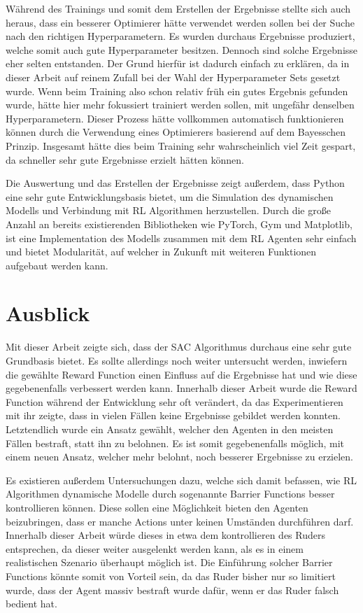 \documentclass[]{iat}
\begin{document}
Während des Trainings und somit dem Erstellen der Ergebnisse stellte sich auch heraus, dass ein besserer Optimierer hätte verwendet werden sollen bei der Suche nach den richtigen Hyperparametern. Es wurden durchaus Ergebnisse produziert, welche somit auch gute Hyperparameter besitzen. Dennoch sind solche Ergebnisse eher selten entstanden. Der Grund hierfür ist dadurch einfach zu erklären, da in dieser Arbeit auf reinem Zufall bei der Wahl der Hyperparameter Sets gesetzt wurde. Wenn beim Training also schon relativ früh ein gutes Ergebnis gefunden wurde, hätte hier mehr fokussiert trainiert werden sollen, mit ungefähr denselben Hyperparametern. Dieser Prozess hätte vollkommen automatisch funktionieren können durch die Verwendung eines Optimierers basierend auf dem Bayesschen Prinzip. Insgesamt hätte dies beim Training sehr wahrscheinlich viel Zeit gespart, da schneller sehr gute Ergebnisse erzielt hätten können.

Die Auswertung und das Erstellen der Ergebnisse zeigt außerdem, dass Python eine sehr gute Entwicklungsbasis bietet, um die Simulation des dynamischen Modells und Verbindung mit RL Algorithmen herzustellen. Durch die große Anzahl an bereits existierenden Bibliotheken wie PyTorch, Gym und Matplotlib, ist eine Implementation des Modells zusammen mit dem RL Agenten sehr einfach und bietet Modularität, auf welcher in Zukunft mit weiteren Funktionen aufgebaut werden kann.
\section{Ausblick}
Mit dieser Arbeit zeigte sich, dass der SAC Algorithmus durchaus eine sehr gute Grundbasis bietet. Es sollte allerdings noch weiter untersucht werden, inwiefern die gewählte Reward Function einen Einfluss auf die Ergebnisse hat und wie diese gegebenenfalls verbessert werden kann. Innerhalb dieser Arbeit wurde die Reward Function während der Entwicklung sehr oft verändert, da das Experimentieren mit ihr zeigte, dass in vielen Fällen keine Ergebnisse gebildet werden konnten. Letztendlich wurde ein Ansatz gewählt, welcher den Agenten in den meisten Fällen bestraft, statt ihn zu belohnen. Es ist somit gegebenenfalls möglich, mit einem neuen Ansatz, welcher mehr belohnt, noch besserer Ergebnisse zu erzielen.

Es existieren außerdem Untersuchungen dazu, welche sich damit befassen, wie RL Algorithmen dynamische Modelle durch sogenannte Barrier Functions besser kontrollieren können. \cite[]{10.1609/aaai.v33i01.33013387} Diese sollen eine Möglichkeit bieten den Agenten beizubringen, dass er manche Actions unter keinen Umständen durchführen darf. Innerhalb dieser Arbeit würde dieses in etwa dem kontrollieren des Ruders entsprechen, da dieser weiter ausgelenkt werden kann, als es in einem realistischen Szenario überhaupt möglich ist. Die Einführung solcher Barrier Functions könnte somit von Vorteil sein, da das Ruder bisher nur so limitiert wurde, dass der Agent massiv bestraft wurde dafür, wenn er das Ruder falsch bedient hat.
\end{document}
